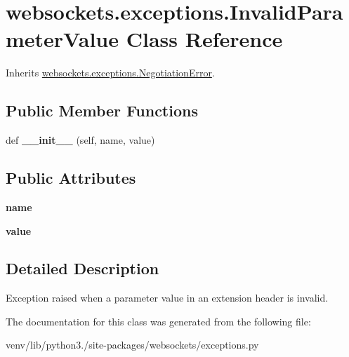 \hypertarget{classwebsockets_1_1exceptions_1_1_invalid_parameter_value}{}\section{websockets.\+exceptions.\+Invalid\+Parameter\+Value Class Reference}
\label{classwebsockets_1_1exceptions_1_1_invalid_parameter_value}


Inherits \hyperlink{classwebsockets_1_1exceptions_1_1_negotiation_error}{websockets.\+exceptions.\+Negotiation\+Error}.

\subsection*{Public Member Functions}
\begin{DoxyCompactItemize}
\item 
\mbox{\label{classwebsockets_1_1exceptions_1_1_invalid_parameter_value_a0e880daffa4cbeed580045c16d623253}} 
def {\bfseries \+\_\+\+\_\+init\+\_\+\+\_\+} (self, name, value)
\end{DoxyCompactItemize}
\subsection*{Public Attributes}
\begin{DoxyCompactItemize}
\item 
\mbox{\label{classwebsockets_1_1exceptions_1_1_invalid_parameter_value_a34e172aabfbf57721195851227496ab2}} 
{\bfseries name}
\item 
\mbox{\label{classwebsockets_1_1exceptions_1_1_invalid_parameter_value_af332551073f71589780209a923bc7506}} 
{\bfseries value}
\end{DoxyCompactItemize}


\subsection{Detailed Description}
\begin{DoxyVerb}Exception raised when a parameter value in an extension header is invalid.\end{DoxyVerb}
 

The documentation for this class was generated from the following file\+:\begin{DoxyCompactItemize}
\item 
venv/lib/python3./site-\/packages/websockets/exceptions.\+py\end{DoxyCompactItemize}
